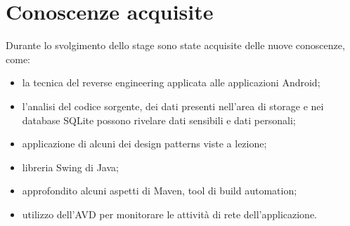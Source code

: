 
\section{Conoscenze acquisite}\label{sec:conoscenze-acquisite}
Durante lo svolgimento dello stage sono state acquisite delle nuove conoscenze, come:
\begin{itemize}\itemsep0em
    \item la tecnica del reverse engineering applicata alle applicazioni Android;
    \item l'analisi del codice sorgente, dei dati presenti nell'area di storage e nei database SQLite possono rivelare dati sensibili e dati personali;
    \item applicazione di alcuni dei design patterns viste a lezione;
    \item libreria Swing di Java;
    \item approfondito alcuni aspetti di Maven, tool di build automation;
    \item utilizzo dell'AVD per monitorare le attività di rete dell'applicazione.
\end{itemize}
